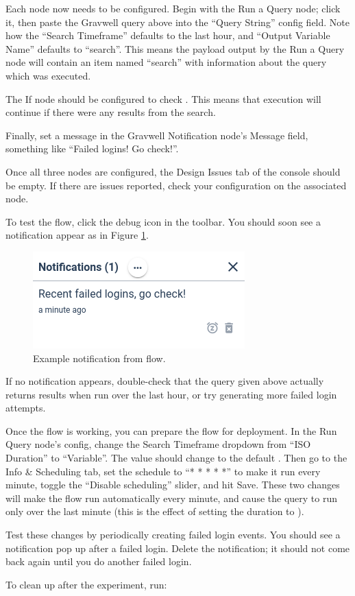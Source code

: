 Each node now needs to be configured. Begin with the Run a Query node; click it, then paste the Gravwell query above into the ``Query String'' config field. Note how the ``Search Timeframe'' defaults to the last hour, and ``Output Variable Name'' defaults to ``search''. This means the payload output by the Run a Query node will contain an item named ``search'' with information about the query which was executed.

The If node should be configured to check . This means that execution will continue if there were any results from the search.

Finally, set a message in the Gravwell Notification node's Message field, something like ``Failed logins! Go check!''.

Once all three nodes are configured, the Design Issues tab of the console should be empty. If there are issues reported, check your configuration on the associated node.

To test the flow, click the debug icon in the toolbar. You should soon see a notification appear as in Figure \ref{fig:lab-notification}.

\begin{figure}
	\includegraphics[width=0.7\linewidth]{images/lab-notification.png}
	\caption{Example notification from flow.}
	\label{fig:lab-notification}
\end{figure}

If no notification appears, double-check that the query given above actually returns results when run over the last hour, or try generating more failed login attempts.

Once the flow is working, you can prepare the flow for deployment.  In the Run Query node's config, change the Search Timeframe dropdown from ``ISO Duration'' to ``Variable''. The value should change to the default . Then go to the Info \& Scheduling tab, set the schedule to ``* * * * *'' to make it run every minute, toggle the ``Disable scheduling'' slider, and hit Save. These two changes will make the flow run automatically every minute, and cause the query to run only over the last minute (this is the effect of setting the duration to ).

Test these changes by periodically creating failed login events. You should see a notification pop up after a failed login. Delete the notification; it should not come back again until you do another failed login.

To clean up after the experiment, run:

